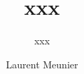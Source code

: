 \documentclass{mimosis}
\title{xxx}
\subtitle{xxx}
\author{Laurent Meunier}
\begin{document}
 

\frontmatter







\dominitoc
\tableofcontents

 \renewcommand\listfigurename{List of Figures and Tables}
 \listoffigures
 
 

\end{document}
